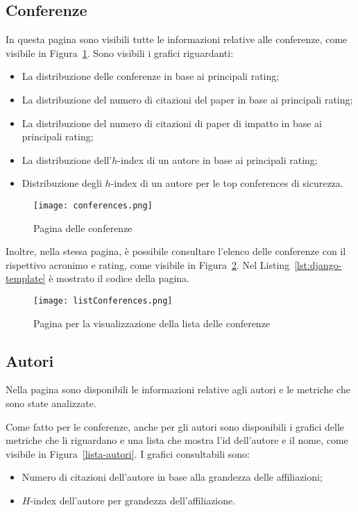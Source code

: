 \subsection{Conferenze}
In questa pagina sono visibili tutte le informazioni relative alle conferenze, come visibile in Figura~\ref{fig:conferences}.
Sono visibili i grafici riguardanti:
\begin{itemize}
  \item La distribuzione delle conferenze in base ai principali rating;
  \item La distribuzione del numero di citazioni del paper in base ai principali rating;
  \item La distribuzione del numero di citazioni di paper di impatto in base ai principali rating;
  \item La distribuzione dell'$h$-index di un autore in base ai principali rating;
  \item Distribuzione degli $h$-index di un autore per le top conferences di sicurezza.
\end{itemize}

\begin{figure}
  \centering
  \texttt{[image: conferences.png]}
  \caption{Pagina delle conferenze}
  \label{fig:conferences}
\end{figure}


Inoltre, nella stessa pagina, è possibile consultare l'elenco delle conferenze con il rispettivo acronimo e rating, come visibile in Figura~\ref{fig:list-conferences}. Nel Listing~\ref{lst:django-template} è mostrato il codice della pagina.


\begin{figure}
  \centering
  \texttt{[image: listConferences.png]}
  \caption{Pagina per la visualizzazione della lista delle conferenze}
  \label{fig:list-conferences}
\end{figure}

\subsection{Autori}
Nella pagina sono disponibili le informazioni relative agli autori e le metriche che sono state analizzate.

Come fatto per le conferenze, anche per gli autori sono disponibili i grafici delle metriche che li riguardano e una lista che mostra l'id dell'autore e il nome, come visibile in Figura~\ref{lista-autori}. I grafici consultabili sono:
\begin{itemize}
  \item Numero di citazioni dell'autore in base alla grandezza delle affiliazioni;
  \item $H$-index dell'autore per grandezza dell'affiliazione.
\end{itemize}

